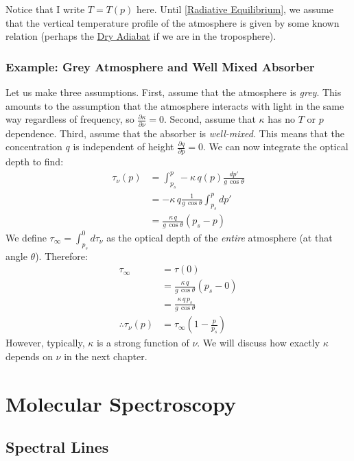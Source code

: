 Notice that I write $T=T(p)$ here. Until \ref{Radiative Equilibrium}, we assume that the vertical temperature profile of the atmosphere is given by some known relation (perhaps the \hyperref[Dry Adiabat]{Dry Adiabat} if we are in the troposphere).

\subsection{Example: Grey Atmosphere and Well Mixed Absorber}

Let us make three assumptions. First, assume that the atmosphere is \textit{grey}. This amounts to the assumption that the atmosphere interacts with light in the same way regardless of frequency, so $\frac{\partial\kappa}{\partial\nu}=0$. Second, assume that $\kappa$ has no $T$ or $p$ dependence. Third, assume that the absorber is \textit{well-mixed}. This means that the concentration $q$ is independent of height $\frac{\partial q}{\partial p}=0$. We can now integrate the optical depth to find:
\begin{align*}
    \tau_\nu(p)&=\int_{p_s}^p-\kappa\,q(p)\frac{dp'}{g\,\cos\theta}\\
    &=-\kappa\,q\frac{1}{g\,\cos\theta}\int_{p_s}^pdp'\\
    &=\frac{\kappa \,q}{g\,\cos\theta}(p_s-p)
\end{align*}
We define $\tau_\infty=\int_{p_s}^0d\tau_\nu$ as the optical depth of the \textit{entire} atmosphere (at that angle $\theta$). Therefore:
\begin{align*}
    \tau_\infty&=\tau(0)\\
    &=\frac{\kappa \,q}{g\,\cos\theta}(p_s-0)\\
    &=\frac{\kappa \,q\,p_s}{g\,\cos\theta}\\
    \therefore\tau_\nu(p)&=\tau_\infty\left(1-\frac{p}{p_s}\right)
\end{align*}
However, typically, $\kappa$ is a strong function of $\nu$. We will discuss how exactly $\kappa$ depends on $\nu$ in the next chapter.

\chapter{Molecular Spectroscopy}

\section{Spectral Lines}

